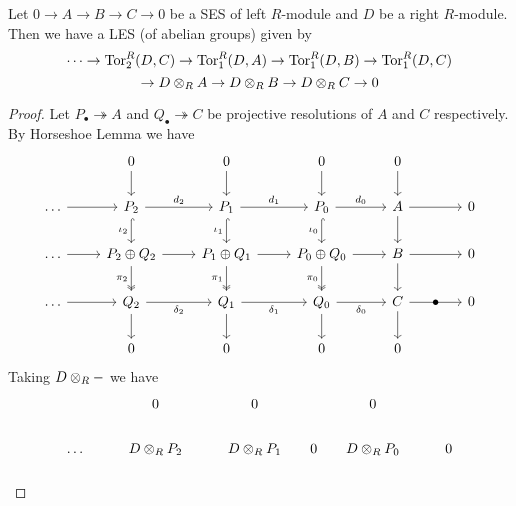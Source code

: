 \begin{thm}
    Let $0\to A\to B\to C \to 0$ be a SES of left $R$-module and $D$ be a right $R$-module. Then we have a LES (of abelian groups) given by 
    \[\dots \to \operatorname{Tor}_2^R(D,C)\to \operatorname{Tor}_1^R(D,A) \to \operatorname{Tor}_1^R(D,B)\to \operatorname{Tor}_1^R(D,C)\]
    \[\to D\otimes_R A \to D\otimes_R B\to D\otimes_R C\to 0\]
\end{thm}
\begin{proof}
    Let $P_\bullet \twoheadrightarrow A$ and $Q_\bullet \twoheadrightarrow C$ be projective resolutions of $A$ and $C$ respectively. By Horseshoe Lemma we have
    \[\begin{tikzcd}[sep=small]
	&& 0 && 0 && 0 && 0 \\
	\\
	\dots && {P_2} && {P_1} && {P_0} && A && 0 \\
	\\
	\dots && {P_2 \oplus Q_2} && {P_1 \oplus Q_1} && {P_0 \oplus Q_0} && B && 0 \\
	\\
	\dots && {Q_2} && {Q_1} && {Q_0} && C & \bullet & 0 \\
	\\
	&& 0 && 0 && 0 && 0
	\arrow[from=1-3, to=3-3]
	\arrow[from=1-5, to=3-5]
	\arrow[from=1-7, to=3-7]
	\arrow[from=1-9, to=3-9]
	\arrow[from=3-1, to=3-3]
	\arrow["{{d_2}}", from=3-3, to=3-5]
	\arrow["{\iota_2}"', hook, from=3-3, to=5-3]
	\arrow["{{d_1}}", from=3-5, to=3-7]
	\arrow["{\iota_1}"', hook, from=3-5, to=5-5]
	\arrow["{{d_0}}", from=3-7, to=3-9]
	\arrow["{\iota_0}"', hook, from=3-7, to=5-7]
	\arrow[from=3-9, to=3-11]
	\arrow[from=3-9, to=5-9]
	\arrow[from=5-1, to=5-3]
	\arrow[from=5-3, to=5-5]
	\arrow["{{\pi_2}}"', two heads, from=5-3, to=7-3]
	\arrow[from=5-5, to=5-7]
	\arrow["{{\pi_1}}"', two heads, from=5-5, to=7-5]
	\arrow[from=5-7, to=5-9]
	\arrow["{{\pi_0}}"', two heads, from=5-7, to=7-7]
	\arrow[from=5-9, to=5-11]
	\arrow[from=5-9, to=7-9]
	\arrow[from=7-1, to=7-3]
	\arrow["{{\delta_2}}"', from=7-3, to=7-5]
	\arrow[from=7-3, to=9-3]
	\arrow["{{\delta_1}}"', from=7-5, to=7-7]
	\arrow[from=7-5, to=9-5]
	\arrow["{{\delta_0}}"', from=7-7, to=7-9]
	\arrow[from=7-7, to=9-7]
	\arrow[from=7-9, to=7-11]
	\arrow[from=7-9, to=9-9]
    \end{tikzcd}\]
    Taking $D\otimes_R -$ we have
    \[\begin{tikzcd}[sep=small]
	&& 0 && 0 && 0 \\
	\\
	\dots && {D \ten_R P_2} && {D \ten_R P_1} & 0 & {D \ten_R P_0} && 0 \\

\end{tikzcd}\]
\end{proof}
